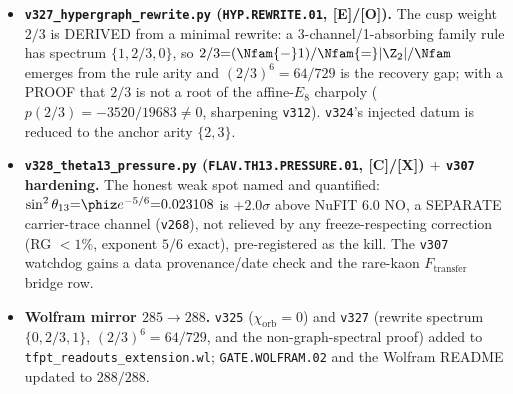 \documentclass[11pt]{article}
\providecommand{\mE}{\textbf{[E]}}\providecommand{\mC}{\textbf{[C]}}
\providecommand{\mO}{\textbf{[O]}}\providecommand{\mX}{\textbf{[X]}}
\begin{document}
\begin{itemize}
  Only $F_{\mathrm{pole}}$ carries the seam rate; the four external rates are honestly fenced (\texttt{v187}/\texttt{v303}).
\item \textbf{\texttt{v327\_hypergraph\_rewrite.py} (\texttt{HYP.REWRITE.01}, \mE/\mO).} The cusp weight $2/3$ is
  DERIVED from a minimal rewrite: a 3-channel/1-absorbing family rule has spectrum $\{1,2/3,0\}$, so
  $2/3{=}(\Nfam{-}1)/\Nfam{=}|\Z_2|/\Nfam$ emerges from the rule arity and $(2/3)^6{=}64/729$ is the recovery gap;
  with a PROOF that $2/3$ is not a root of the affine-$E_8$ charpoly ($p(2/3){=}-3520/19683\ne0$, sharpening \texttt{v312}).
  \texttt{v324}'s injected datum is reduced to the anchor arity $\{2,3\}$.
\item \textbf{\texttt{v328\_theta13\_pressure.py} (\texttt{FLAV.TH13.PRESSURE.01}, \mC/\mX) $+$ \texttt{v307}
  hardening.} The honest weak spot named and quantified: $\sin^2\theta_{13}{=}\phiz e^{-5/6}{=}0.023108$ is
  $+2.0\sigma$ above NuFIT 6.0 NO, a SEPARATE carrier-trace channel (\texttt{v268}), not relieved by any
  freeze-respecting correction (RG $<1\%$, exponent $5/6$ exact), pre-registered as the kill.  The \texttt{v307}
  watchdog gains a data provenance/date check and the rare-kaon $F_{\mathrm{transfer}}$ bridge row.
\item \textbf{Wolfram mirror $285\to288$.} \texttt{v325} ($\chi_{\mathrm{orb}}{=}0$) and \texttt{v327} (rewrite
  spectrum $\{0,2/3,1\}$, $(2/3)^6{=}64/729$, and the non-graph-spectral proof) added to
  \texttt{tfpt\_readouts\_extension.wl}; \texttt{GATE.WOLFRAM.02} and the Wolfram README updated to $288/288$.
\end{itemize}
\end{document}
